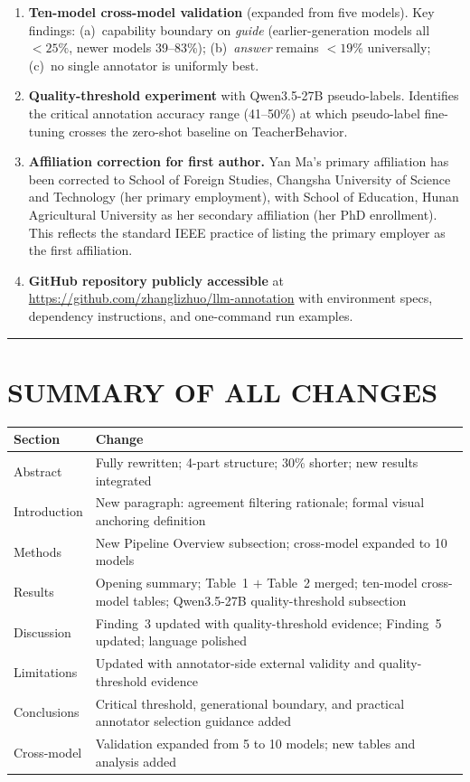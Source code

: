 \documentclass[11pt]{article}
\begin{document}
\begin{enumerate}[nosep]
  \item \textbf{Ten-model cross-model validation} (expanded from five models). Key findings: (a)~capability boundary on \textit{guide} (earlier-generation models all ${}<25\%$, newer models 39--83\%); (b)~\textit{answer} remains ${}<19\%$ universally; (c)~no single annotator is uniformly best.

  \item \textbf{Quality-threshold experiment} with Qwen3.5-27B pseudo-labels. Identifies the critical annotation accuracy range (41--50\%) at which pseudo-label fine-tuning crosses the zero-shot baseline on TeacherBehavior.

  \item \textbf{Affiliation correction for first author.} Yan Ma's primary affiliation has been corrected to School of Foreign Studies, Changsha University of Science and Technology (her primary employment), with School of Education, Hunan Agricultural University as her secondary affiliation (her PhD enrollment). This reflects the standard IEEE practice of listing the primary employer as the first affiliation.

  \item \textbf{GitHub repository publicly accessible} at \url{https://github.com/zhanglizhuo/llm-annotation} with environment specs, dependency instructions, and one-command run examples.
\end{enumerate}

\rule{\textwidth}{0.4pt}

\section*{SUMMARY OF ALL CHANGES}

\begin{center}
\begin{tabular}{lp{10cm}}
\hline
\textbf{Section} & \textbf{Change} \\
\hline
Abstract & Fully rewritten; 4-part structure; 30\% shorter; new results integrated \\
Introduction & New paragraph: agreement filtering rationale; formal visual anchoring definition \\
Methods & New Pipeline Overview subsection; cross-model expanded to 10 models \\
Results & Opening summary; Table~1 $+$ Table~2 merged; ten-model cross-model tables; Qwen3.5-27B quality-threshold subsection \\
Discussion & Finding~3 updated with quality-threshold evidence; Finding~5 updated; language polished \\
Limitations & Updated with annotator-side external validity and quality-threshold evidence \\
Conclusions & Critical threshold, generational boundary, and practical annotator selection guidance added \\
Cross-model & Validation expanded from 5 to 10 models; new tables and analysis added \\
\hline
\end{tabular}
\end{center}
\end{document}
